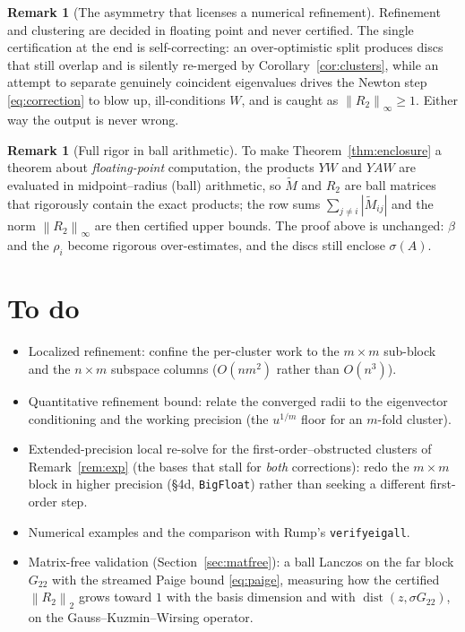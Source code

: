 \documentclass[11pt,a4paper]{article}
\newcommand{\norm}[1]{\left\|#1\right\|}
\newcommand{\abs}[1]{\left|#1\right|}
\newcommand{\spec}{\sigma}
\theoremstyle{plain}
\theoremstyle{definition}
\newtheorem{remark}[theorem]{Remark}
\begin{document}
\begin{remark}[The asymmetry that licenses a numerical refinement]
Refinement and clustering are decided in floating point and never certified. The
single certification at the end is self-correcting: an over-optimistic split produces
discs that still overlap and is silently re-merged by Corollary~\ref{cor:clusters},
while an attempt to separate genuinely coincident eigenvalues drives the Newton step
\eqref{eq:correction} to blow up, ill-conditions $W$, and is caught as
$\norm{R_2}_\infty\ge1$. Either way the output is never wrong.
\end{remark}

\begin{remark}[Full rigor in ball arithmetic]
To make Theorem~\ref{thm:enclosure} a theorem about \emph{floating-point} computation,
the products $YW$ and $YAW$ are evaluated in midpoint--radius (ball) arithmetic, so
$\widetilde M$ and $R_2$ are ball matrices that rigorously contain the exact products;
the row sums $\sum_{j\ne i}\abs{\widetilde M_{ij}}$ and the norm $\norm{R_2}_\infty$ are
then certified upper bounds. The proof above is unchanged: $\beta$ and the $\rho_i$
become rigorous over-estimates, and the discs still enclose $\spec(A)$.
\end{remark}

\section*{To do}
\begin{itemize}
  \item Localized refinement: confine the per-cluster work to the $m\times m$
    sub-block and the $n\times m$ subspace columns ($O(nm^2)$ rather than $O(n^3)$).
  \item Quantitative refinement bound: relate the converged radii to the eigenvector
    conditioning and the working precision (the $u^{1/m}$ floor for an $m$-fold
    cluster).
  \item Extended-precision local re-solve for the first-order--obstructed clusters of
    Remark~\ref{rem:exp} (the bases that stall for \emph{both} corrections): redo the
    $m\times m$ block in higher precision (\S4d, \texttt{BigFloat}) rather than seeking
    a different first-order step.
  \item Numerical examples and the comparison with Rump's \texttt{verifyeigall}.
  \item Matrix-free validation (Section~\ref{sec:matfree}): a ball Lanczos on the far block
    $G_{22}$ with the streamed Paige bound \eqref{eq:paige}, measuring how the certified
    $\norm{R_2}_2$ grows toward $1$ with the basis dimension and with $\operatorname{dist}(z,\spec G_{22})$,
    on the Gauss--Kuzmin--Wirsing operator.
\end{itemize}
\end{document}
